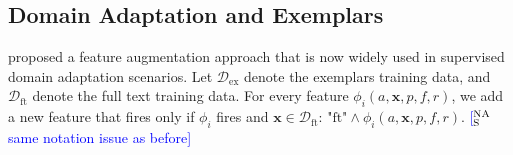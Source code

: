 \documentclass[11pt,a4paper]{article}
\newcommand{\indicator}[1]{I_{\{#1\}}} %
\newcommand{\exemplars}{\mathrm{ex}}
\newcommand{\fulltext}{\mathrm{ft}}
\newcommand{\ensuretext}[1]{#1}
\newcommand{\nssmarker}{\ensuretext{\textcolor{magenta}{\ensuremath{^{\textsc{NS}}_{\textsc{S}}}}}}
\newcommand{\stmarker}{\ensuretext{\textcolor{orange}{\ensuremath{^{\textsc{S}}_{\textsc{T}}}}}}
\newcommand{\nasmarker}{\ensuretext{\textcolor{blue}{\ensuremath{^{\textsc{NA}}_{\textsc{S}}}}}}
\newcommand{\arkcomment}[3]{\ensuretext{\textcolor{#3}{[#1 #2]}}}
\newcommand{\nss}[1]{\arkcomment{\nssmarker}{#1}{magenta}}
\newcommand{\st}[1]{\arkcomment{\stmarker}{#1}{orange}}
\newcommand{\nascomment}[1]{\arkcomment{\nasmarker}{#1}{blue}}
\newcommand{\x}{\mathbf{x}}
\newcommand{\finalversion}[1]{}
\begin{document}
\subsection{Domain Adaptation and Exemplars}
\label{sec:frust}
 proposed a feature augmentation approach that is now
widely used in supervised domain adaptation scenarios.
Let $\mathcal{D}_{\exemplars}$ denote the exemplars training data, and
$\mathcal{D}_{\fulltext}$ denote the full text training data.
For every feature $\phi_i(a, \mathbf{x}, p, f, r)$, we add a new
feature that fires only if $\phi_i$ fires and $\x \in \mathcal{D}_{\fulltext}$:
$\text{"ft"} \wedge \phi_i(a, \mathbf{x}, p, f,
r)$.\finalversion{\nss{why the $i$ subscript? is that for the training
    instance as above?}} \nascomment{same notation issue as before}

\end{document}
